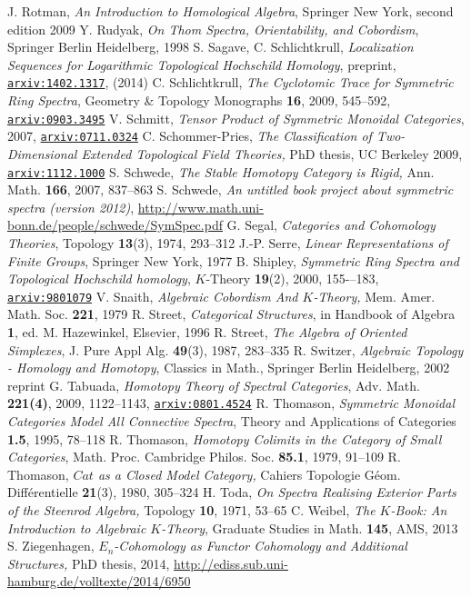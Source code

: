 \documentclass[12pt,bibliography=totoc,final]{scrbook} %
\def\arxiv#1{\href{http://arxiv.org/abs/#1}{\texttt{arxiv:#1}}} \def\arxivold#1{\href{http://arxiv.org/abs/math/#1}{\texttt{arxiv:#1}}}
\begin{document}
\begin{thebibliography}{9999999}
 J. Rotman, \emph{An Introduction to Homological Algebra}, Springer New York, second edition 2009
 Y. Rudyak, \emph{On Thom Spectra, Orientability, and Cobordism}, Springer Berlin Heidelberg, 1998
 S. Sagave, C. Schlichtkrull, \emph{Localization Sequences for
Logarithmic Topological Hochschild Homology}, preprint, \arxiv{1402.1317}, (2014) 
 C. Schlichtkrull, \emph{The Cyclotomic Trace for Symmetric Ring 
Spectra}, Geometry \& Topology Monographs \textbf{16}, 2009, 545--592, \arxiv{0903.3495}
 V. Schmitt, \emph{Tensor Product of Symmetric Monoidal Categories}, 2007, \arxiv{0711.0324}
 C. Schommer-Pries, \emph{The Classification of Two-Dimensional Extended Topological Field Theories,}
PhD thesis, UC Berkeley 2009, \arxiv{1112.1000}
 S. Schwede, \emph{The Stable Homotopy Category is Rigid,} Ann. Math. \textbf{166}, 2007, 837--863
 S. Schwede, \emph{An untitled book project about symmetric spectra (version 2012)}, 
\href{http://www.math.uni-bonn.de/people/schwede/SymSpec.pdf}{http://www.math.uni-bonn.de/people/schwede/SymSpec.pdf}
 G. Segal, \emph{Categories and Cohomology Theories}, Topology \textbf{13}(3), 1974, 293--312 %
 J.-P. Serre, \emph{Linear Representations of Finite Groups}, Springer New York, 1977%
 B. Shipley, \emph{Symmetric Ring Spectra and Topological Hochschild 
homology}, $K$-Theory \textbf{19}(2), 2000, 155-–183, \arxivold{9801079}
 V. Snaith, \emph{Algebraic Cobordism And $K$-Theory,} Mem. Amer. Math. Soc. \textbf{221}, 1979
 R. Street, \emph{Categorical Structures}, in Handbook of Algebra \textbf{1},
ed. M. Hazewinkel, Elsevier, 1996
 R. Street, \emph{The Algebra of Oriented Simplexes}, J. Pure Appl Alg. \textbf{49}(3), 1987, 283--335
 R. Switzer, \emph{Algebraic Topology - Homology and Homotopy}, Classics in Math., 
Springer Berlin Heidelberg, 2002 reprint %
 G. Tabuada, \emph{Homotopy Theory of Spectral Categories}, Adv. Math.
\textbf{221(4)}, 2009, 1122--1143, \arxiv{0801.4524}
 R. Thomason, \emph{Symmetric Monoidal Categories Model All Connective 
Spectra}, Theory and Applications of Categories \textbf{1.5}, 1995, 78--118 %
 R. Thomason, \emph{Homotopy Colimits in the Category of Small 
Categories}, Math. Proc. Cambridge Philos. Soc. \textbf{85.1}, 1979, 91--109 %
 R. Thomason, \emph{$Cat$ as a Closed Model Category,} Cahiers Topologie G\'eom.
Diff\'erentielle \textbf{21}(3), 1980, 305--324
 H. Toda, \emph{On Spectra Realising Exterior Parts of the Steenrod Algebra,}
Topology \textbf{10}, 1971, 53--65
 C. Weibel, \emph{The $K$-Book: An Introduction to Algebraic $K$-Theory},
Graduate Studies in Math. \textbf{145}, AMS, 2013
 S. Ziegenhagen, \emph{$E_n$-Cohomology as Functor Cohomology and
Additional Structures,} PhD thesis, 2014, \href{http://ediss.sub.uni-hamburg.de/volltexte/2014/6950}{
http://ediss.sub.uni-hamburg.de/volltexte/2014/6950}
\end{thebibliography}
\end{document}

